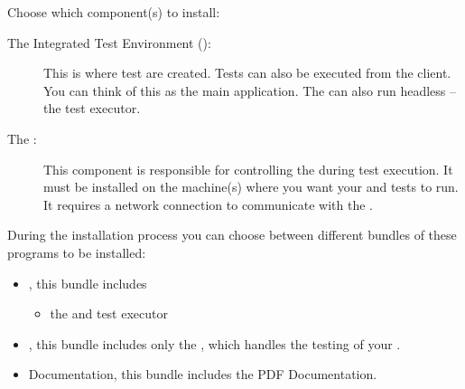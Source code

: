 Choose which component(s) to install: 

\begin{description}
\item [The Integrated Test Environment (\ite{}): ]{This is where test are created. Tests can also be executed from the client. You can think of this as the main application. The \ite{} can also run headless -- the test executor.}
\item [The \gdagent{}:]{ This component is responsible for controlling the \gdaut{} during test execution. It must be installed on the machine(s) where you want your \gdaut{} and tests to run. It requires a network connection to communicate with the \ite{}. }
\end{description}

During the installation process you can choose between different bundles of these programs to be installed:

\begin{itemize}
\item \app{}, this bundle includes
	\begin{itemize}
	\item the \ite{} and test executor
	\end{itemize}
\item \gdagent{}, this bundle includes only the \gdagent{}, which handles the testing of your \gdaut{}.
\item \app{} Documentation, this bundle includes the PDF Documentation.
\end{itemize}
